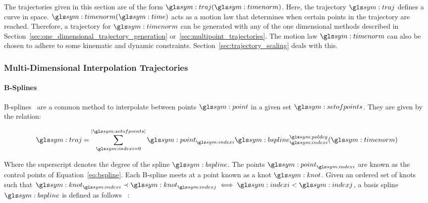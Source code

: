 		The trajectories given in this section are of the form
		$\traj(\timenorm)$. Here, the trajectory $\traj$ defines a curve in
		space. $\timenorm(\timesym)$ acts as a motion law that determines when
		certain points in the trajectory are reached. Therefore, a trajectory
		for $\timenorm$ can be generated with any of the one dimensional methods
		described in Section~\ref{sec:one_dimensional_trajectory_generation}
		or~\ref{sec:multipoint_trajectories}. The motion law $\timenorm$ can
		also be chosen to adhere to some kinematic and dynamic constraints.
		Section~\ref{sec:trajectory_scaling} deals with this.

		\subsubsection{Multi-Dimensional Interpolation Trajectories}%
		\label{sec:multi_dimensional_interpolation_trajectories}

			\paragraph{B-Splines}%
			\label{sec:b_spines}

				B-splines~%
				\cite{bib:traj:trajectory_planning_for_automatic_machines_and_robots}%
				\cite{bib:traj:handbook_on_splines_for_the_user}%
				\cite{bib:math:spline_notes}
				are a common
				method to interpolate between points
				$\point$ in a given set
				$\setofpoints$.
				They are given by the relation:

				\begin{equation}
					\traj = \sum_{\indexi = 0}^{\cardinality{\setofpoints}}
						\point_{\indexi}\bspline_{\indexi}^{\poldeg}(\timenorm)
					\label{eq:bspline}
				\end{equation}

				Where the superscript denotes the degree of the spline
				$\bspline$. The points $\point_{\indexi}$ are known as the
				control points of Equation~\ref{eq:bspline}.  Each B-spline
				meets at a point known as a knot $\knot$. Given an ordered set
				of knots such that
				\(
					\knot_{\indexi} \prec \knot_{\indexj} \iff \indexi < \indexj
				\), a basis spline $\bspline$ is defined as follows~%
				\cite{bib:math:spline_notes}:

